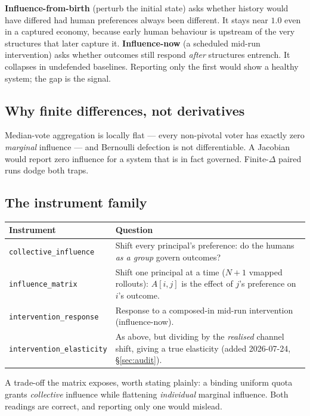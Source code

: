 \documentclass[11pt]{article}
\begin{document}
\noindent \textbf{Influence-from-birth} (perturb the initial state) asks whether history
would have differed had human preferences always been different. It stays near $1.0$ even in
a captured economy, because early human behaviour is upstream of the very structures that
later capture it. \textbf{Influence-now} (a scheduled mid-run intervention) asks whether
outcomes still respond \emph{after} structures entrench. It collapses in undefended
baselines. Reporting only the first would show a healthy system; the gap is the signal.

\subsection{Why finite differences, not derivatives}

Median-vote aggregation is locally flat --- every non-pivotal voter has exactly zero
\emph{marginal} influence --- and Bernoulli defection is not differentiable. A Jacobian would
report zero influence for a system that is in fact governed. Finite-$\Delta$ paired runs
dodge both traps.

\subsection{The instrument family}

\begin{center}
\begin{tabular}{@{}lp{9.6cm}@{}}
\toprule
\textbf{Instrument} & \textbf{Question} \\
\midrule
\texttt{collective\_influence} & Shift every principal's preference: do the humans
  \emph{as a group} govern outcomes? \\
\texttt{influence\_matrix} & Shift one principal at a time ($N{+}1$ vmapped rollouts):
  $A[i,j]$ is the effect of $j$'s preference on $i$'s outcome. \\
\texttt{intervention\_response} & Response to a composed-in mid-run intervention
  (influence-now). \\
\texttt{intervention\_elasticity} & As above, but dividing by the \emph{realised} channel
  shift, giving a true elasticity (added 2026-07-24, \S\ref{sec:audit}). \\
\bottomrule
\end{tabular}
\end{center}

\noindent A trade-off the matrix exposes, worth stating plainly: a binding uniform quota
grants \emph{collective} influence while flattening \emph{individual} marginal influence.
Both readings are correct, and reporting only one would mislead.
\end{document}
